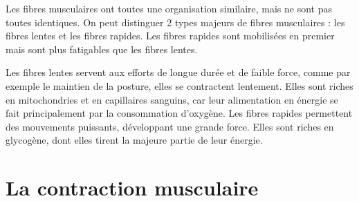 \documentclass{report}
\begin{document}
Les fibres musculaires ont toutes une organisation similaire, mais ne sont pas toutes identiques. 
On peut distinguer 2 types majeurs de fibres musculaires : les fibres lentes et les fibres rapides. Les fibres rapides sont mobilisées en premier mais sont plus fatigables que les fibres lentes.  

Les fibres lentes servent aux efforts de longue durée et de faible force, comme par exemple le maintien de la posture, elles se contractent lentement. 
Elles sont riches en mitochondries et en capillaires sanguins, car leur alimentation en énergie se fait principalement par la consommation d'oxygène. 
Les fibres rapides permettent des mouvements puissants, développant une grande force. Elles sont riches en glycogène, dont elles tirent la majeure partie de leur énergie. 






\section{La contraction musculaire}
\end{document}
